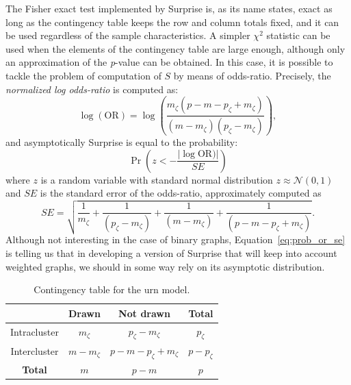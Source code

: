 The Fisher exact test implemented by Surprise is, as its name states, exact as long as the contingency table keeps the row and column totals fixed, and it can be used regardless of the sample characteristics.
A simpler $\chi^2$ statistic can be used when the elements of the contingency table are large enough, although only an approximation of the \emph{p}-value can be obtained.
In this case, it is possible to tackle the problem of computation of $S$ by means of odds-ratio.
Precisely, the \emph{normalized log odds-ratio} is computed as: 
\begin{equation}
\log(\textrm{OR}) = \log\left( \frac{m_\zeta(p-m-p_\zeta+m_\zeta)}{(m-m_\zeta)(p_\zeta-m_\zeta)} \right ),
\end{equation}
and asymptotically Surprise is equal to the probability:
\begin{equation}\label{eq:prob_or_se}
\Pr\left(z < -\frac{|\log\textrm{OR})|}{SE} \right)
\end{equation}
where $z$ is a random variable with standard normal distribution $z \approx \mathcal{N}(0,1)$ and $SE$ is the standard error of the odds-ratio, approximately computed as 
\begin{equation}
SE=\sqrt{\frac{1}{m_\zeta} + \frac{1}{(p_\zeta-m_\zeta)} + \frac{1}{(m-m_\zeta)} + \frac{1}{(p - m - p_\zeta + m_\zeta)}}.
\end{equation}
Although not interesting in the case of binary graphs, Equation~\ref{eq:prob_or_se} is telling us that in developing a version of Surprise that will keep into account weighted graphs, we should in some way rely on its asymptotic distribution.

\begin{table}[htb!]
\centering
\begin{tabular}{|c|c|c|c|}
\hline
 & Drawn & Not drawn & \textbf{Total}\\
\hline
Intracluster & $m_\zeta$ & $p_\zeta-m_\zeta$ & $p_\zeta$\\
\hline
Intercluster & $m-m_\zeta$ & $p-m-p_\zeta+m_\zeta$ & $p-p_\zeta$ \\
\hline
\textbf{Total} & $m$ & $p-m$ & $p$ \\
\hline
\end{tabular}
\caption{Contingency table for the urn model.}
\label{tab:contingency_table}
\end{table}

